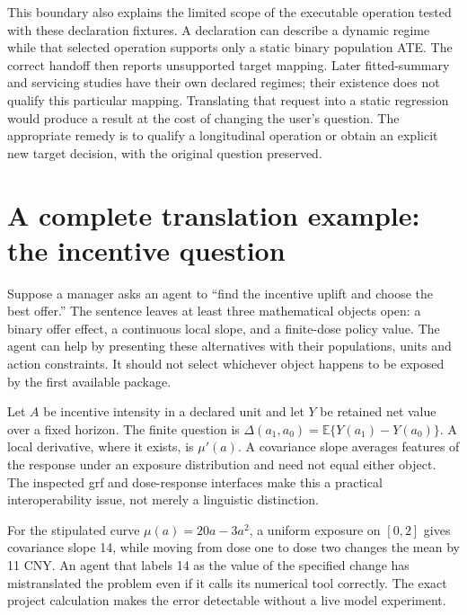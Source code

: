 This boundary also explains the limited scope of the executable operation
tested with these declaration fixtures. A declaration can describe a dynamic
regime while that selected operation supports only a static binary population
ATE. The correct handoff then reports unsupported target mapping. Later
fitted-summary and servicing studies have their own declared regimes; their
existence does not qualify this particular mapping. Translating that request into a
static regression would produce a result at the cost of changing the user's
question. The appropriate remedy is to qualify a longitudinal operation or
obtain an explicit new target decision, with the original question preserved.


\section{A complete translation example: the incentive question}
\label{v13:la-dose}

Suppose a manager asks an agent to ``find the incentive uplift and choose the
best offer.'' The sentence leaves at least three mathematical objects open:
a binary offer effect, a continuous local slope, and a finite-dose policy value.
The agent can help by presenting these alternatives with their populations,
units and action constraints. It should not select whichever object happens
to be exposed by the first available package.

Let $A$ be incentive intensity in a declared unit and let $Y$ be retained net
value over a fixed horizon. The finite question is
$\Delta(a_1,a_0)=\mathbb E\{Y(a_1)-Y(a_0)\}$. A local derivative, where it
exists, is $\mu'(a)$. A covariance slope averages features of the response
under an exposure distribution and need not equal either object. The inspected
grf and dose-response interfaces make this a practical interoperability issue,
not merely a linguistic distinction. \citep{v13_sw_grf,v13_sw_causaldrf}

For the stipulated curve $\mu(a)=20a-3a^2$, a uniform exposure on $[0,2]$
gives covariance slope 14, while moving from dose one to dose two changes the
mean by 11 CNY. An agent that labels 14 as the value of the specified change
has mistranslated the problem even if it calls its numerical tool correctly.
The exact project calculation makes the error detectable without a live model
experiment. \citep{v13_project_exact}

